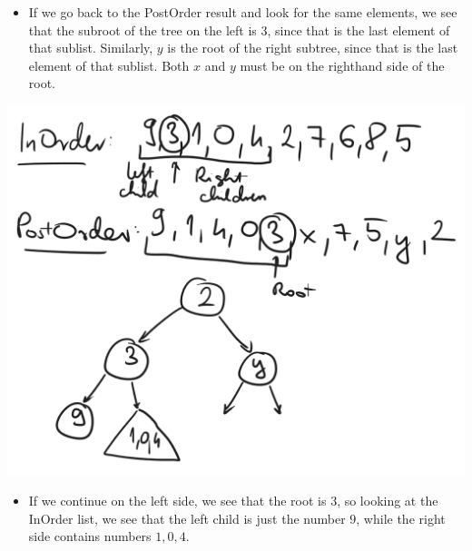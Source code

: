 \begin{itemize}
    \item If we go back to the PostOrder result and look for the same elements, we see that the subroot of the tree on the left is $3$, since that is the last element of that sublist. Similarly, $y$ is the root of the right subtree, since that is the last element of that sublist. Both $x$ and $y$ must be on the righthand side of the root.
\end{itemize}

\begin{center}
    \includegraphics[width=\linewidth]{11/11/reconstruct_04.png}
\end{center}

\begin{itemize}
    \item If we continue on the left side, we see that the root is $3$, so looking at the InOrder list, we see that the left child is just the number $9$, while the right side contains numbers $1,0,4$.
\end{itemize}

